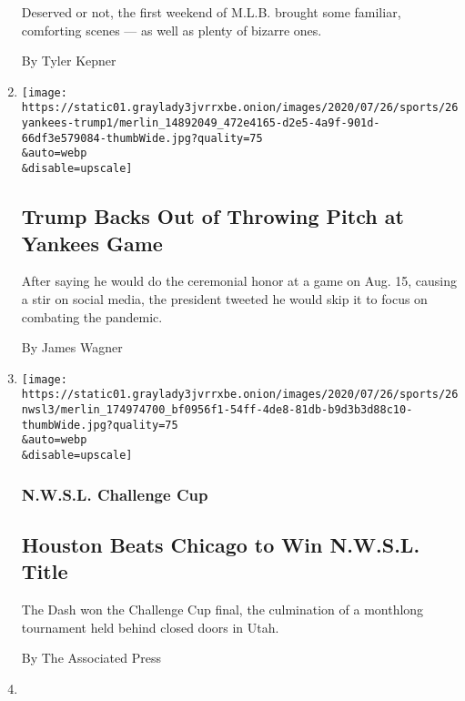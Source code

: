 \begin{enumerate}
  Deserved or not, the first weekend of M.L.B. brought some familiar,
  comforting scenes --- as well as plenty of bizarre ones.

  By Tyler Kepner
\item
  \href{/2020/07/26/sports/baseball/trump-yankees-pitch-deblasio.html}{}

  \texttt{[image: https://static01.graylady3jvrrxbe.onion/images/2020/07/26/sports/26yankees-trump1/merlin\_14892049\_472e4165-d2e5-4a9f-901d-66df3e579084-thumbWide.jpg?quality=75\\\&auto=webp\\\&disable=upscale]}

  \hypertarget{trump-backs-out-of-throwing-pitch-at-yankees-game}{%
  \subsection{Trump Backs Out of Throwing Pitch at Yankees
  Game}\label{trump-backs-out-of-throwing-pitch-at-yankees-game}}

  After saying he would do the ceremonial honor at a game on Aug. 15,
  causing a stir on social media, the president tweeted he would skip it
  to focus on combating the pandemic.

  By James Wagner
\item
  \href{/2020/07/26/sports/soccer/houston-dash-nwsl.html}{}

  \texttt{[image: https://static01.graylady3jvrrxbe.onion/images/2020/07/26/sports/26nwsl3/merlin\_174974700\_bf0956f1-54ff-4de8-81db-b9d3b3d88c10-thumbWide.jpg?quality=75\\\&auto=webp\\\&disable=upscale]}

  \hypertarget{nwsl-challenge-cup}{%
  \subsubsection{N.W.S.L. Challenge Cup}\label{nwsl-challenge-cup}}

  \hypertarget{houston-beats-chicago-to-win-nwsl-title}{%
  \subsection{Houston Beats Chicago to Win N.W.S.L.
  Title}\label{houston-beats-chicago-to-win-nwsl-title}}

  The Dash won the Challenge Cup final, the culmination of a monthlong
  tournament held behind closed doors in Utah.

  By The Associated Press
\item
  \href{/2020/07/26/sports/soccer/premier-league-decision-day.html}{}


\end{enumerate}
